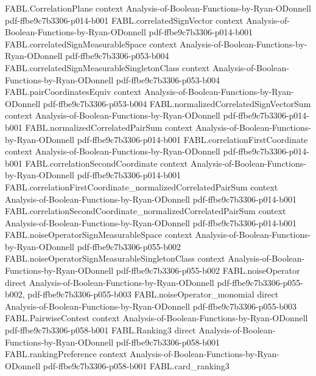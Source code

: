 \begin{theorem}
  {FABL.CorrelationPlane}
  {context}
  {Analysis-of-Boolean-Functions-by-Ryan-ODonnell}
  {pdf-ffbe9c7b3306-p014-b001}
\proofstep
  {FABL.correlatedSignVector}
  {context}
  {Analysis-of-Boolean-Functions-by-Ryan-ODonnell}
  {pdf-ffbe9c7b3306-p014-b001}
\proofstep
  {FABL.correlatedSignMeasurableSpace}
  {context}
  {Analysis-of-Boolean-Functions-by-Ryan-ODonnell}
  {pdf-ffbe9c7b3306-p053-b004}
\proofstep
  {FABL.correlatedSignMeasurableSingletonClass}
  {context}
  {Analysis-of-Boolean-Functions-by-Ryan-ODonnell}
  {pdf-ffbe9c7b3306-p053-b004}
\proofstep
  {FABL.pairCoordinatesEquiv}
  {context}
  {Analysis-of-Boolean-Functions-by-Ryan-ODonnell}
  {pdf-ffbe9c7b3306-p053-b004}
\proofstep
  {FABL.normalizedCorrelatedSignVectorSum}
  {context}
  {Analysis-of-Boolean-Functions-by-Ryan-ODonnell}
  {pdf-ffbe9c7b3306-p014-b001}
\proofstep
  {FABL.normalizedCorrelatedPairSum}
  {context}
  {Analysis-of-Boolean-Functions-by-Ryan-ODonnell}
  {pdf-ffbe9c7b3306-p014-b001}
\proofstep
  {FABL.correlationFirstCoordinate}
  {context}
  {Analysis-of-Boolean-Functions-by-Ryan-ODonnell}
  {pdf-ffbe9c7b3306-p014-b001}
\proofstep
  {FABL.correlationSecondCoordinate}
  {context}
  {Analysis-of-Boolean-Functions-by-Ryan-ODonnell}
  {pdf-ffbe9c7b3306-p014-b001}
\proofstep
  {FABL.correlationFirstCoordinate_normalizedCorrelatedPairSum}
  {context}
  {Analysis-of-Boolean-Functions-by-Ryan-ODonnell}
  {pdf-ffbe9c7b3306-p014-b001}
\proofstep
  {FABL.correlationSecondCoordinate_normalizedCorrelatedPairSum}
  {context}
  {Analysis-of-Boolean-Functions-by-Ryan-ODonnell}
  {pdf-ffbe9c7b3306-p014-b001}
\proofstep
  {FABL.noiseOperatorSignMeasurableSpace}
  {context}
  {Analysis-of-Boolean-Functions-by-Ryan-ODonnell}
  {pdf-ffbe9c7b3306-p055-b002}
\proofstep
  {FABL.noiseOperatorSignMeasurableSingletonClass}
  {context}
  {Analysis-of-Boolean-Functions-by-Ryan-ODonnell}
  {pdf-ffbe9c7b3306-p055-b002}
\proofstep
  {FABL.noiseOperator}
  {direct}
  {Analysis-of-Boolean-Functions-by-Ryan-ODonnell}
  {pdf-ffbe9c7b3306-p055-b002,
    pdf-ffbe9c7b3306-p055-b003}
\proofstep
  {FABL.noiseOperator_monomial}
  {direct}
  {Analysis-of-Boolean-Functions-by-Ryan-ODonnell}
  {pdf-ffbe9c7b3306-p055-b003}
\proofstep
  {FABL.PairwiseContest}
  {context}
  {Analysis-of-Boolean-Functions-by-Ryan-ODonnell}
  {pdf-ffbe9c7b3306-p058-b001}
\proofstep
  {FABL.Ranking3}
  {direct}
  {Analysis-of-Boolean-Functions-by-Ryan-ODonnell}
  {pdf-ffbe9c7b3306-p058-b001}
\proofstep
  {FABL.rankingPreference}
  {context}
  {Analysis-of-Boolean-Functions-by-Ryan-ODonnell}
  {pdf-ffbe9c7b3306-p058-b001}
\proofstep
  {FABL.card_ranking3}

\end{theorem}
